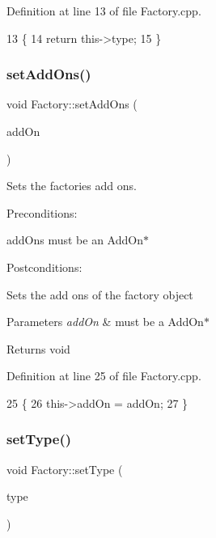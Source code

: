 Definition at line 13 of file Factory.\+cpp.


\begin{DoxyCode}
13                        \{
14     \textcolor{keywordflow}{return} this->type;
15 \}
\end{DoxyCode}
\mbox{\label{classFactory_a58dbf2659ee06c61b2dae1a9a36fac53}} 
\subsubsection{\texorpdfstring{set\+Add\+Ons()}{setAddOns()}}
{\footnotesize\ttfamily void Factory\+::set\+Add\+Ons (\begin{DoxyParamCaption}\item[{\hyperlink{classAddOn}{Add\+On} $\ast$}]{add\+On }\end{DoxyParamCaption})}



Sets the factories add ons. 

Preconditions\+:
\begin{DoxyItemize}
\item add\+Ons must be an Add\+On$\ast$
\end{DoxyItemize}

Postconditions\+:
\begin{DoxyItemize}
\item Sets the add ons of the factory object
\end{DoxyItemize}


\begin{DoxyParams}{Parameters}
{\em add\+On} & must be a Add\+On$\ast$ \\
\hline
\end{DoxyParams}
\begin{DoxyReturn}{Returns}
void 
\end{DoxyReturn}


Definition at line 25 of file Factory.\+cpp.


\begin{DoxyCode}
25                                     \{
26     this->addOn = addOn;
27 \}
\end{DoxyCode}
\mbox{\label{classFactory_a7484d514b094114231dbeb3df70e9d0b}} 
\subsubsection{\texorpdfstring{set\+Type()}{setType()}}
{\footnotesize\ttfamily void Factory\+::set\+Type (\begin{DoxyParamCaption}\item[{\hyperlink{classType}{Type} $\ast$}]{type }\end{DoxyParamCaption})}



